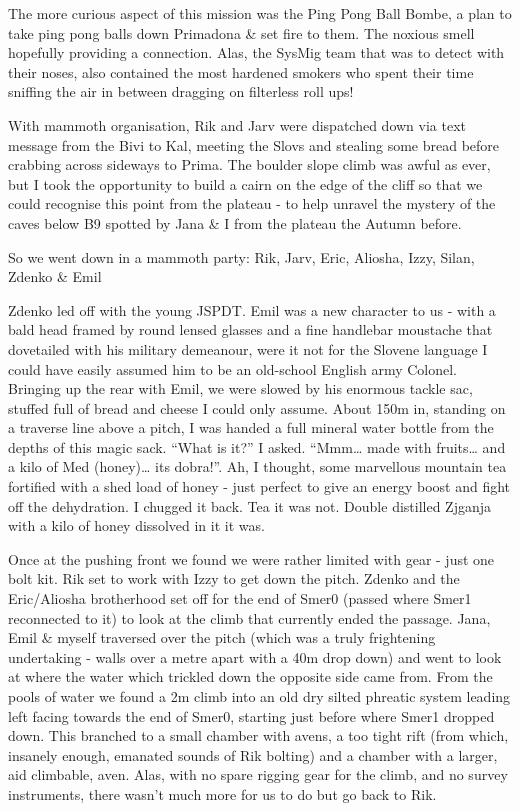 The more curious aspect of this mission was the Ping Pong Ball Bombe, a
plan to take ping pong balls down Primadona \& set fire to them. The
noxious smell hopefully providing a connection. Alas, the SysMig team
that was to detect with their noses, also contained the most hardened
smokers who spent their time sniffing the air in between dragging on
filterless roll ups!

With mammoth organisation, Rik and Jarv were dispatched down via text
message from the Bivi to Kal, meeting the Slovs and stealing some bread
before crabbing across sideways to Prima. The boulder slope climb was
awful as ever, but I took the opportunity to build a cairn on the edge
of the cliff so that we could recognise this point from the plateau - to
help unravel the mystery of the caves below B9 spotted by Jana \& I from
the plateau the Autumn before.

So we went down in a mammoth party: Rik, Jarv, Eric, Aliosha, Izzy,
Silan, Zdenko \& Emil

Zdenko led off with the young JSPDT. Emil was a new character to us -
with a bald head framed by round lensed glasses and a fine handlebar
moustache that dovetailed with his military demeanour, were it not for
the Slovene language I could have easily assumed him to be an old-school
English army Colonel. Bringing up the rear with Emil, we were slowed by
his enormous tackle sac, stuffed full of bread and cheese I could only
assume. About 150m in, standing on a traverse line above a pitch, I was
handed a full mineral water bottle from the depths of this magic sack.
``What is it?'' I asked. ``Mmm\ldots{} made with fruits\ldots{} and a
kilo of Med (honey)\ldots{} its dobra!''. Ah, I thought, some marvellous
mountain tea fortified with a shed load of honey - just perfect to give
an energy boost and fight off the dehydration. I chugged it back. Tea it
was not. Double distilled Zjganja with a kilo of honey dissolved in it
it was.

Once at the pushing front we found we were rather limited with gear -
just one bolt kit. Rik set to work with Izzy to get down the pitch.
Zdenko and the Eric/Aliosha brotherhood set off for the end of Smer0
(passed where Smer1 reconnected to it) to look at the climb that
currently ended the passage. Jana, Emil \& myself traversed over the
pitch (which was a truly frightening undertaking - walls over a metre
apart with a 40m drop down) and went to look at where the water which
trickled down the opposite side came from. From the pools of water we
found a 2m climb into an old dry silted phreatic system leading left
facing towards the end of Smer0, starting just before where Smer1
dropped down. This branched to a small chamber with avens, a too tight
rift (from which, insanely enough, emanated sounds of Rik bolting) and a
chamber with a larger, aid climbable, aven. Alas, with no spare rigging
gear for the climb, and no survey instruments, there wasn't much more
for us to do but go back to Rik.

